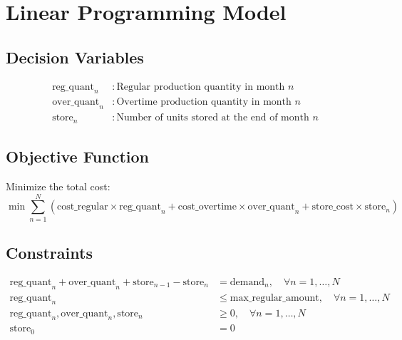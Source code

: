 \documentclass{article}
\begin{document}
\section*{Linear Programming Model}

\subsection*{Decision Variables}
\begin{align*}
\text{reg\_quant}_n &: \text{Regular production quantity in month } n \\
\text{over\_quant}_n &: \text{Overtime production quantity in month } n \\
\text{store}_n &: \text{Number of units stored at the end of month } n
\end{align*}

\subsection*{Objective Function}
Minimize the total cost:
\[
\min \sum_{n=1}^{N} \left( \text{cost\_regular} \times \text{reg\_quant}_n + \text{cost\_overtime} \times \text{over\_quant}_n + \text{store\_cost} \times \text{store}_n \right)
\]

\subsection*{Constraints}

\begin{align*}
\text{reg\_quant}_n + \text{over\_quant}_n + \text{store}_{n-1} - \text{store}_n &= \text{demand}_{n}, \quad \forall n = 1, \ldots, N \\
\text{reg\_quant}_n &\leq \text{max\_regular\_amount}, \quad \forall n = 1, \ldots, N \\
\text{reg\_quant}_n, \text{over\_quant}_n, \text{store}_n &\geq 0, \quad \forall n = 1, \ldots, N \\
\text{store}_0 &= 0
\end{align*}
\end{document}
